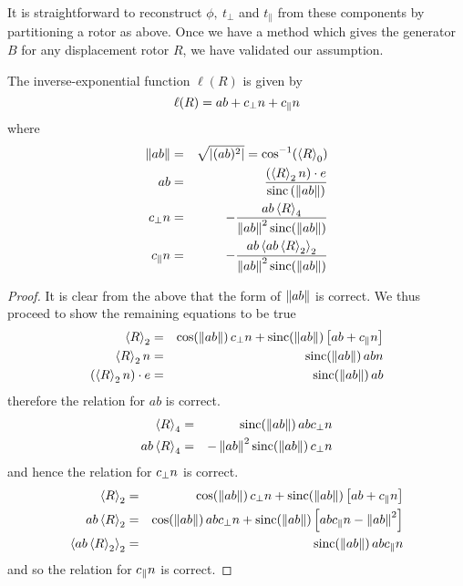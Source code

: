 It is straightforward to reconstruct $\phi,\ t_\perp$ and
$t_\parallel$ from these components by partitioning a rotor as above. Once we
have a method which gives the generator $B$ for any displacement rotor $R$, we
have validated our assumption.

\begin{thm}
The inverse-exponential function $\ell(R)$ is given by
\[
\ell(R) = ab + c_\perp n + c_\parallel n
\]
where
\begin{eqnarray*}
\left\Vert ab \right\Vert & = & \sqrt{\left| (ab)^2 \right|}  = \cos^{-1}(\left<R\right>_0) \\
ab & = & \frac{\left(\left<R\right>_2 n \right) \cdot e}
{\mathrm{sinc}\left(\left\Vert ab \right\Vert\right)}\\
c_\perp n & = & - \frac{ab \left<R\right>_4}
{\left\Vert ab \right\Vert^2\mathrm{sinc}(\left\Vert ab \right\Vert)} \\
c_\parallel n & = & - \frac{ab \left<ab \left<R\right>_2\right>_2}
{\left\Vert ab \right\Vert^2\mathrm{sinc}(\left\Vert ab \right\Vert)}
\end{eqnarray*}
\end{thm}
\begin{proof}
It is clear from the above that the form of
$\left\Vert ab \right\Vert$ is correct. We thus proceed to show the remaining
equations to be true
\begin{eqnarray*}
\left<R\right>_2 & = & \cos(\left\Vert ab \right\Vert) \, c_\perp n +
\mathrm{sinc}(\left\Vert ab \right\Vert) \left[ab + c_\parallel n\right]\\
\left<R\right>_2 n & = & \mathrm{sinc}(\left\Vert ab \right\Vert) \, abn\\
\left(\left<R\right>_2 n\right) \cdot e & = & \mathrm{sinc}(\left\Vert ab \right\Vert) \, ab
\end{eqnarray*}
therefore the relation for $ab$ is correct.
\begin{eqnarray*}
\left<R\right>_4 & = & \mathrm{sinc}(\left\Vert ab \right\Vert) \, abc_\perp n \\
ab \left<R\right>_4 & = & -\left\Vert ab \right\Vert^2 \mathrm{sinc}(\left\Vert ab \right\Vert) \, c_\perp n 
\end{eqnarray*}
and hence the relation for $c_\perp n$ is correct.
\begin{eqnarray*}
\left<R\right>_2 & = & \cos(\left\Vert ab \right\Vert) \, c_\perp n +
\mathrm{sinc}(\left\Vert ab \right\Vert) \left[ab + c_\parallel n\right]\\
ab \left<R\right>_2 & = & \cos(\left\Vert ab \right\Vert) \, abc_\perp n +
\mathrm{sinc}(\left\Vert ab \right\Vert) \left[ab c_\parallel n - \left\Vert ab \right\Vert^2\right]\\
\left<ab \left<R\right>_2\right>_2 & = & 
\mathrm{sinc}(\left\Vert ab \right\Vert) \, ab c_\parallel n
\end{eqnarray*}
and so the relation for $c_\parallel n$ is correct.
\end{proof}


